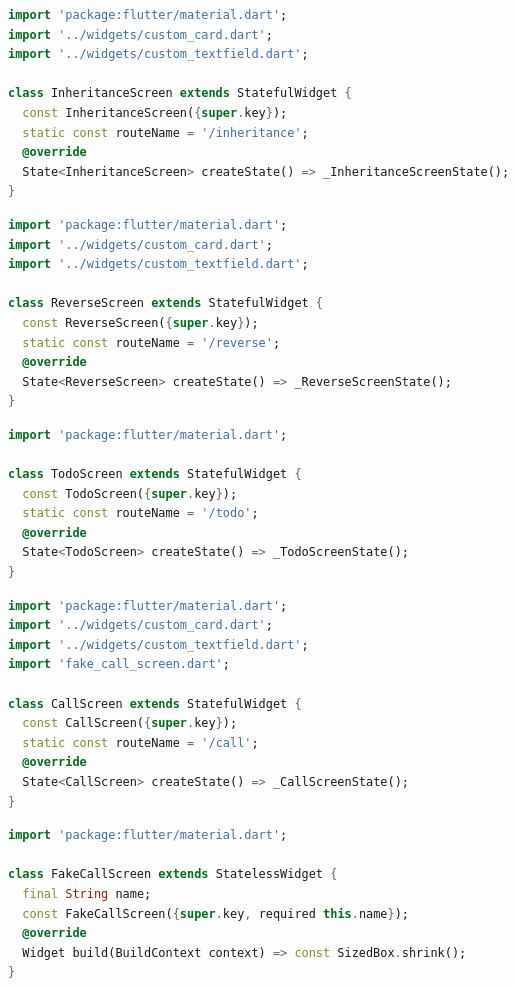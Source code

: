 \documentclass{article}
\begin{document}
\begin{lstlisting}[language=Dart, caption={\texttt{\detokenize{lib/screens/inheritance_screen.dart}}}]
import 'package:flutter/material.dart';
import '../widgets/custom_card.dart';
import '../widgets/custom_textfield.dart';

class InheritanceScreen extends StatefulWidget {
  const InheritanceScreen({super.key});
  static const routeName = '/inheritance';
  @override
  State<InheritanceScreen> createState() => _InheritanceScreenState();
}
\end{lstlisting}

\begin{lstlisting}[language=Dart, caption={\texttt{\detokenize{lib/screens/reverse_screen.dart}}}]
import 'package:flutter/material.dart';
import '../widgets/custom_card.dart';
import '../widgets/custom_textfield.dart';

class ReverseScreen extends StatefulWidget {
  const ReverseScreen({super.key});
  static const routeName = '/reverse';
  @override
  State<ReverseScreen> createState() => _ReverseScreenState();
}
\end{lstlisting}

\begin{lstlisting}[language=Dart, caption={\texttt{\detokenize{lib/screens/todo_screen.dart}}}]
import 'package:flutter/material.dart';

class TodoScreen extends StatefulWidget {
  const TodoScreen({super.key});
  static const routeName = '/todo';
  @override
  State<TodoScreen> createState() => _TodoScreenState();
}
\end{lstlisting}

\begin{lstlisting}[language=Dart, caption={\texttt{\detokenize{lib/screens/call_screen.dart}}}]
import 'package:flutter/material.dart';
import '../widgets/custom_card.dart';
import '../widgets/custom_textfield.dart';
import 'fake_call_screen.dart';

class CallScreen extends StatefulWidget {
  const CallScreen({super.key});
  static const routeName = '/call';
  @override
  State<CallScreen> createState() => _CallScreenState();
}
\end{lstlisting}

\begin{lstlisting}[language=Dart, caption={\texttt{\detokenize{lib/screens/fake_call_screen.dart}}}]
import 'package:flutter/material.dart';

class FakeCallScreen extends StatelessWidget {
  final String name;
  const FakeCallScreen({super.key, required this.name});
  @override
  Widget build(BuildContext context) => const SizedBox.shrink();
}
\end{lstlisting}
\end{document}
